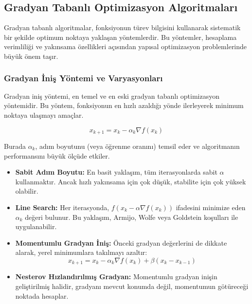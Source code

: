 \subsection{Gradyan Tabanlı Optimizasyon Algoritmaları}

Gradyan tabanlı algoritmalar, fonksiyonun türev bilgisini kullanarak sistematik bir şekilde optimum noktaya yaklaşan yöntemlerdir. Bu yöntemler, hesaplama verimliliği ve yakınsama özellikleri açısından yapısal optimizasyon problemlerinde büyük önem taşır.

\subsubsection{Gradyan İniş Yöntemi ve Varyasyonları}
Gradyan iniş yöntemi, en temel ve en eski gradyan tabanlı optimizasyon yöntemidir. Bu yöntem, fonksiyonun en hızlı azaldığı yönde ilerleyerek minimum noktaya ulaşmayı amaçlar.

\begin{equation}
x_{k+1} = x_k - \alpha_k \nabla f(x_k)
\end{equation}

Burada $\alpha_k$, adım boyutunu (veya öğrenme oranını) temsil eder ve algoritmanın performansını büyük ölçüde etkiler.

\begin{tcolorbox}[title=Gradyan İniş Varyasyonları]
\begin{itemize}
    \item \textbf{Sabit Adım Boyutu:} En basit yaklaşım, tüm iterasyonlarda sabit $\alpha$ kullanmaktır. Ancak hızlı yakınsama için çok düşük, stabilite için çok yüksek olabilir.
    
    \item \textbf{Line Search:} Her iterasyonda, $f(x_k - \alpha \nabla f(x_k))$ ifadesini minimize eden $\alpha_k$ değeri bulunur. Bu yaklaşım, Armijo, Wolfe veya Goldstein koşulları ile uygulanabilir.
    
    \item \textbf{Momentumlu Gradyan İniş:} Önceki gradyan değerlerini de dikkate alarak, yerel minimumlara takılmayı azaltır:
    $$x_{k+1} = x_k - \alpha_k \nabla f(x_k) + \beta (x_k - x_{k-1})$$
    
    \item \textbf{Nesterov Hızlandırılmış Gradyan:} Momentumlu gradyan inişin geliştirilmiş halidir, gradyanı mevcut konumda değil, momentumun götüreceği noktada hesaplar.
\end{itemize}
\end{tcolorbox}

